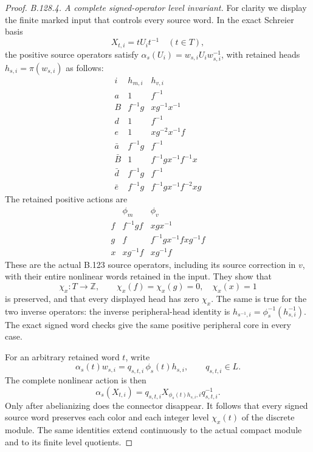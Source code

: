 \begin{proof}
\emph{B.128.4. A complete signed-operator level invariant.}
For clarity we display the finite marked input that controls every
source word. In the exact Schreier basis
\[
 X_{t,i}=tU_it^{-1}\quad(t\in T),
\]
the positive source operators satisfy
$\alpha_s(U_i)=w_{s,i}U_iw_{s,i}^{-1}$, with retained heads
$h_{s,i}=\pi(w_{s,i})$ as follows:
\begin{equation}\label{eq:B128-head-table}
\begin{array}{c|c|c}
 i&h_{m,i}&h_{v,i}\\\hline
 a&1&f^{-1}\\
 B&f^{-1}g&xg^{-1}x^{-1}\\
 d&1&f^{-1}\\
 e&1&xg^{-2}x^{-1}f\\
 \bar a&f^{-1}g&f^{-1}\\
 \bar B&1&f^{-1}gx^{-1}f^{-1}x\\
 \bar d&f^{-1}g&f^{-1}\\
 \bar e&f^{-1}g&f^{-1}gx^{-1}f^{-2}xg
\end{array}
\end{equation}
The retained positive actions are
\begin{equation}\label{eq:B128-retained-actions}
\begin{array}{c|c|c}
 &\phi_m&\phi_v\\\hline
 f&f^{-1}gf&xgx^{-1}\\
 g&f&f^{-1}gx^{-1}fxg^{-1}f\\
 x&xg^{-1}f&xg^{-1}f
\end{array}
\end{equation}
These are the actual B.123 source operators, including its source
correction in $v$, with their entire nonlinear words retained in
the input. They show that
\[
 \chi_x:T\to\mathbb Z,\qquad
 \chi_x(f)=\chi_x(g)=0,\quad\chi_x(x)=1
\]
is preserved, and that every displayed head has zero $\chi_x$.
The same is true for the two inverse operators: the inverse
peripheral-head identity is
$h_{s^{-1},i}=\phi_s^{-1}(h_{s,i}^{-1})$.
The exact signed word checks give the same positive peripheral
core in every case.

For an arbitrary retained word $t$, write
\[
 \alpha_s(t)w_{s,i}
      =q_{s,t,i}\,\phi_s(t)h_{s,i},\qquad q_{s,t,i}\in L.
\]
The complete nonlinear action is then
\[
 \alpha_s(X_{t,i})=
 q_{s,t,i}X_{\phi_s(t)h_{s,i},i}q_{s,t,i}^{-1}.
\]
Only after abelianizing does the connector disappear. It follows
that every signed source word preserves each color and each
integer level $\chi_x(t)$ of the discrete module. The same
identities extend continuously to the actual compact module and
to its finite level quotients.


\end{proof}
